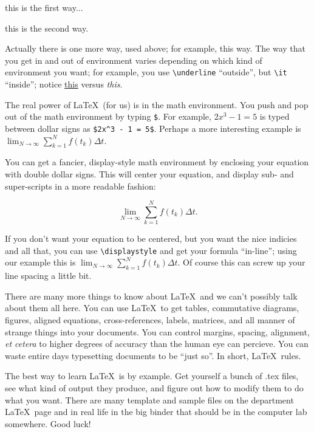 \documentclass{article}
\begin{document}
\centerline{this is the first way...}

\begin{center}
this is the second way.
\end{center}

\noindent Actually there is one more way, used above; for example,
{\sc this way}.  The way that you get in and out of environment varies
depending on which kind of environment you want; for example, you use
\verb|\underline| ``outside'', but \verb|\it| ``inside'';
notice \underline{this} versus {\it this}.

The real power of \LaTeX\ (for us) is in the math environment. You
push and pop out of the math environment by typing \verb|$|. For
example, $2x^3 - 1 = 5$ is typed between dollar signs as
\verb|$2x^3 - 1 = 5$|. Perhaps a more interesting example is
$\lim_{N \to \infty} \sum_{k=1}^N f(t_k) \Delta t$.

You can get a fancier, display-style math
environment by enclosing your equation with double dollar signs.
This will center your equation, and display sub- and super-scripts in
a more readable fashion:

$$\lim_{N \to \infty} \sum_{k=1}^N f(t_k) \Delta t.$$

If you don't want your equation to be centered, but you want the nice
indicies and all that, you can use \verb|\displaystyle| and get your
formula ``in-line''; using our example this is
$\displaystyle \lim_{N \to \infty} \sum_{k=1}^N f(t_k) \Delta t.$  Of
course this can screw up your line spacing a little bit.

There are many more things to know about \LaTeX\ and we can't
possibly talk about them all here.
You can use \LaTeX\ to get tables, commutative diagrams, figures,
aligned equations, cross-references, labels, matrices, and all manner
of strange things into your documents.  You can control margins,
spacing, alignment, {\it et cetera} to higher degrees of accuracy than
the human eye can percieve.  You can waste entire days typesetting
documents to be ``just so''.  In short, \LaTeX\ rules.

The best way to learn \LaTeX\ is by example. Get yourself a bunch
of .tex files, see what kind of output they produce, and figure out how
to modify them to do what you want.  There are many template and
sample files on the department \LaTeX\ page and in real life in the
big binder that should be in the computer lab somewhere.  Good luck!
\end{document}
